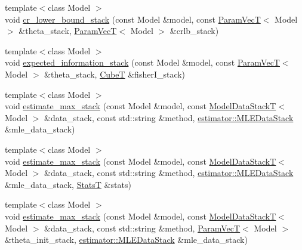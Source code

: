 \begin{DoxyCompactItemize}
{\footnotesize template$<$class Model $>$ }\\void \hyperlink{namespacemappel_1_1methods_1_1openmp_aba5970f5df4416a3d26c3ca5a86b8da5}{cr\+\_\+lower\+\_\+bound\+\_\+stack} (const Model \&model, const \hyperlink{namespacemappel_a0f86d3153e4e27b095012f140eea58de}{Param\+VecT}$<$ Model $>$ \&theta\+\_\+stack, \hyperlink{namespacemappel_a0f86d3153e4e27b095012f140eea58de}{Param\+VecT}$<$ Model $>$ \&crlb\+\_\+stack)
\item 
{\footnotesize template$<$class Model $>$ }\\void \hyperlink{namespacemappel_1_1methods_1_1openmp_ad58ad93952714ee5b5d7701cdf6032a8}{expected\+\_\+information\+\_\+stack} (const Model \&model, const \hyperlink{namespacemappel_a0f86d3153e4e27b095012f140eea58de}{Param\+VecT}$<$ Model $>$ \&theta\+\_\+stack, \hyperlink{namespacemappel_ab2afab4e6c8805e83946670d882768c2}{CubeT} \&fisher\+I\+\_\+stack)
\item 
{\footnotesize template$<$class Model $>$ }\\void \hyperlink{namespacemappel_1_1methods_1_1openmp_a2bbaebf7c6b7b0ed3ee4f0f7402ffc4f}{estimate\+\_\+max\+\_\+stack} (const Model \&model, const \hyperlink{namespacemappel_aaeb6665bc57476dd93c2df6ad8bc4768}{Model\+Data\+StackT}$<$ Model $>$ \&data\+\_\+stack, const std\+::string \&method, \hyperlink{namespacemappel_1_1estimator_structmappel_1_1estimator_1_1MLEDataStack}{estimator\+::\+M\+L\+E\+Data\+Stack} \&mle\+\_\+data\+\_\+stack)
\item 
{\footnotesize template$<$class Model $>$ }\\void \hyperlink{namespacemappel_1_1methods_1_1openmp_a0af63cdb807bd28497c32e3191e83181}{estimate\+\_\+max\+\_\+stack} (const Model \&model, const \hyperlink{namespacemappel_aaeb6665bc57476dd93c2df6ad8bc4768}{Model\+Data\+StackT}$<$ Model $>$ \&data\+\_\+stack, const std\+::string \&method, \hyperlink{namespacemappel_1_1estimator_structmappel_1_1estimator_1_1MLEDataStack}{estimator\+::\+M\+L\+E\+Data\+Stack} \&mle\+\_\+data\+\_\+stack, \hyperlink{namespacemappel_a04ab395b0cf82c4ce68a36b2212649a5}{StatsT} \&stats)
\item 
{\footnotesize template$<$class Model $>$ }\\void \hyperlink{namespacemappel_1_1methods_1_1openmp_a70dc7b79d0b63bb604e670a7cd075c56}{estimate\+\_\+max\+\_\+stack} (const Model \&model, const \hyperlink{namespacemappel_aaeb6665bc57476dd93c2df6ad8bc4768}{Model\+Data\+StackT}$<$ Model $>$ \&data\+\_\+stack, const std\+::string \&method, \hyperlink{namespacemappel_a0f86d3153e4e27b095012f140eea58de}{Param\+VecT}$<$ Model $>$ \&theta\+\_\+init\+\_\+stack, \hyperlink{namespacemappel_1_1estimator_structmappel_1_1estimator_1_1MLEDataStack}{estimator\+::\+M\+L\+E\+Data\+Stack} \&mle\+\_\+data\+\_\+stack)

\end{DoxyCompactItemize}
